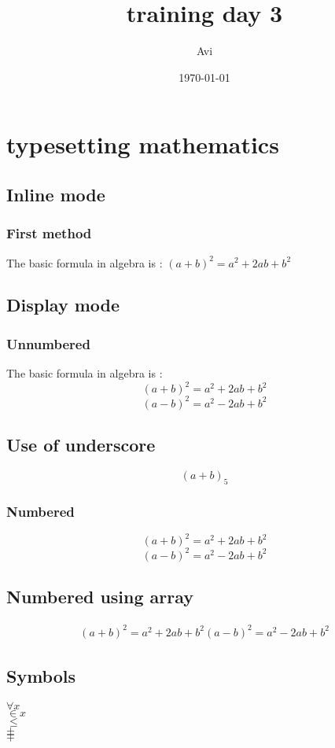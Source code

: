 \documentclass{report}
\title{training day 3}
\author{Avi }
\date{\today}
\begin{document}
\maketitle
\chapter{typesetting mathematics}
\section{Inline mode}
\subsection{First method}
The basic formula in algebra is : \( (a+b)^2=a^2+2ab+b^2 \)
\section{Display mode}
\subsection{Unnumbered }
The basic formula in algebra is :\[(a+b)^2=a^2+2ab+b^2 \]  
                                 \[(a-b)^{2}=a^2-2ab+b^2 \]
\section{Use of underscore}
\[(a+b)_5\]

\subsection{Numbered}
\begin{equation}
    (a+b)^2=a^2+2ab+b^2 
\end{equation}
\begin{equation}
   (a-b)^2=a^2-2ab+b^2  
\end{equation}
\section{Numbered using array}
\begin{eqnarray}
(a+b)^2=a^2+2ab+b^2
(a-b)^2=a^2-2ab+b^2 
\end{eqnarray}
\section{Symbols}
$\forall x$\\
$\in x$\\
$\le$\\
$\pm$\\
$\mp$\\
\end{document}
